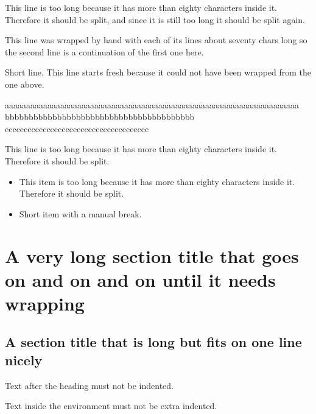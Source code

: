 \documentclass{article}
\begin{document}
This line is too long because it has more than eighty characters
  inside it. Therefore it should be split, and since it is still too
  long it should be split again.

This line was wrapped by hand with each of its lines about seventy chars
  long so the second line is a continuation of the first one here.

Short line.
This line starts fresh because it could not have been wrapped from
  the one above.

aaaaaaaaaaaaaaaaaaaaaaaaaaaaaaaaaaaaaaaaaaaaaaaaaaaaaaaaaaaaaaaaaaaaa
  bbbbbbbbbbbbbbbbbbbbbbbbbbbbbbbbbbbbbbbb
  cccccccccccccccccccccccccccccccccccccc

\begin{theorem}
  This line is too long because it has more than eighty characters
    inside it. Therefore it should be split.
\end{theorem}

\begin{itemize}
  \item This item is too long because it has more than eighty
      characters inside it. Therefore it should be split.
  \item Short item
    with a manual break.
\end{itemize}

\section{A very long section title that goes on and on and on until
  it needs wrapping}

\subsection{A section title that is long but fits on one line nicely}
Text after the heading must not be indented.

\begin{theorem}
  Text inside the environment must not be extra indented.
\end{theorem}
\end{document}
